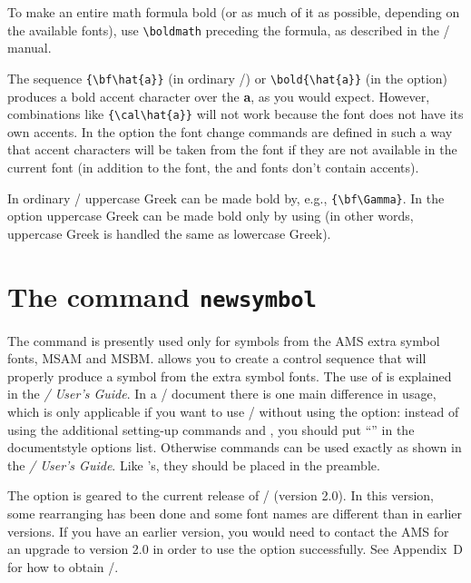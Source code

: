To make an entire math formula bold (or as much of it as possible,
depending on the available fonts), use \verb=\boldmath= preceding
the formula, as described in the \latex/ manual.

The sequence \verb={\bf\hat{a}}= (in ordinary \latex/) or
\verb=\bold{\hat{a}}= (in the  option) produces a bold accent
character over the {\bf a}, as you would expect.
However, combinations like
\verb"{\cal\hat{a}}" will not work because the  font does
not have its own accents.  In the  option the font change
commands are defined in such a way that accent characters will be
taken from the  font if they are not available in
the current font (in addition to the  font, the  and
 fonts don't contain accents).

In ordinary \latex/ uppercase Greek can be made bold by, e.g.,
\verb"{\bf\Gamma}".  In the  option uppercase
Greek can be made bold only by using  (in other words,
uppercase Greek is handled the same as lowercase Greek).
\sloppypar

\section{The command {\tt\bslash newsymbol}}
\label{s:newsym}

The command  is presently used only for symbols from the
AMS extra symbol fonts, MSAM and MSBM.   allows you to create a
control sequence that will properly produce a symbol from the extra symbol
fonts.  The use of  is
explained in the {\em\amsfonts/ User's Guide\/}.
In a \latex/ document
there is one main difference in usage, which is only applicable
if you want to use \amsfonts/ without using the 
option: instead of using the additional
setting-up commands  and ,
you should put
``'' in the documentstyle options list.
Otherwise  commands can be used exactly as
shown in the {\em\amsfonts/ User's Guide\/}.  Like 's,
they should be placed in the preamble.

The  option is geared to the current release of
\amsfonts/ (version 2.0).  In this version, some rearranging has been done
and some font names are different than in earlier versions.
If you have an earlier version,
you would need to contact the AMS for an upgrade to version 2.0
in order to use the  option successfully.  See Appendix~D for how
to obtain \amsfonts/.

